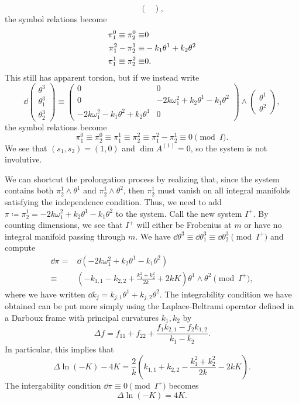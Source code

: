 \begin{example}
\[\begin{pmatrix}
    \end{pmatrix},
    \]
    the symbol relations become 
    \begin{align}
        \pi^0_1\equiv \pi^0_2\equiv& 0 \notag\\
        \pi^2_1-\pi^1_2\equiv& -k_1\theta^1+k_2\theta^2\notag\\
        \pi^1_1\equiv \pi^2_2\equiv & 0.
    \end{align}
    This still has apparent torsion, but if we instead write 
    \[\dd\begin{pmatrix}
        \theta^3\\\theta^3_1\\\theta^3_2
    \end{pmatrix}\equiv 
    \begin{pmatrix}
        0 & 0\\
        0 & -2k\omega^2_1+k_2\theta^1-k_1\theta^2\\
        -2k\omega^2_1-k_1\theta^2+k_2\theta^1 & 0
    \end{pmatrix}
    \wedge \begin{pmatrix}
        \theta^1\\\theta^2
    \end{pmatrix},
    \]
    the symbol relations become 
    \[\pi^0_1\equiv \pi^0_2\equiv\pi^1_1\equiv\pi^2_2\equiv \pi^2_1-\pi^1_2\equiv 0\pmod{I}.\]
    We see that $(s_1,s_2)=(1,0)$ and $\dim A^{(1)}=0$, so the system is not involutive.

    We can shortcut the prolongation process by realizing that, since the system contains both $\pi^1_2\wedge\theta^1$ and $\pi^1_2\wedge\theta^2$, then $\pi^1_2$ must vanish on all integral manifolds satisfying the independence condition. Thus, we need to add $\pi\coloneqq \pi^1_2=-2k\omega^2_1+k_2\theta^1-k_1\theta^2$ to the system. Call the new system $I^+$. By counting dimensions, we see that $I^+$ will either be Frobenius at $m$ or have no integral manifold passing through $m$. We have $\dd\theta^3\equiv \dd\theta^3_1\equiv \dd\theta^3_2\pmod{I^+}$ and compute 
    \begin{align}
        \dd\pi =&\dd(-2k\omega^2_1+k_2\theta^1-k_1\theta^2)\\
        \equiv & (-k_{1,1}-k_{2,2}+\frac{k_1^2+k_2^2}{2k}+2kK)\theta^1\wedge\theta^2 \pmod{I^+},
    \end{align}
    where we have written $\dd k_j=k_{j,1}\theta^1+k_{j,2}\theta^2$. The integrability condition we have obtained can be put more simply using the Laplace-Beltrami operator defined in a Darboux frame with principal curvatures $k_1,k_2$ by
    \[\Delta f = f_{11}+f_{22}+\frac{f_1k_{2,1}-f_2k_{1,2}}{k_1-k_2}.\]
    In particular, this implies that
    \[\Delta \ln(-K)-4K=\frac{2}{k}\left(k_{1,1}+k_{2,2}-\frac{k_1^2+k_2^2}{2k}-2kK\right).\]
    The intergability condition $\dd\pi\equiv 0\pmod{I^+}$ becomes
    \[\Delta\ln(-K)=4K.\]
\end{example}

